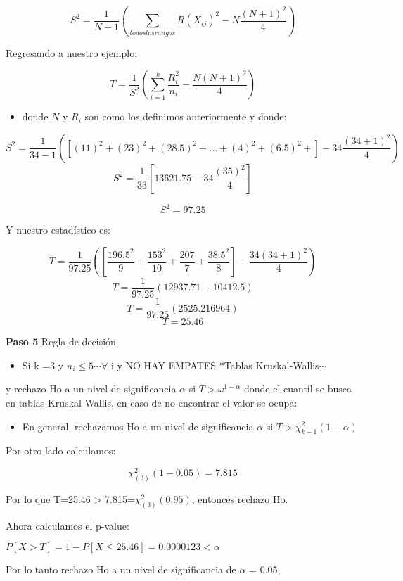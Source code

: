 \documentclass[a4paper,oneside,openany]{book}
\providecommand{\tightlist}{%
  \setlength{\itemsep}{0pt}\setlength{\parskip}{0pt}}
\begin{document}
\[ S^2 = \frac{1}{N-1}\left(\sum_{todos los rangos}R(X_{ij})^2-N\frac{(N+1)^2}{4}\right)\]

Regresando a nuestro ejemplo:

\[T= \frac{1}{S^2}\left(\sum_{i=1}^{k}\frac{R^2_{i}}{n_{i}}-\frac{N(N+1)^2}{4}\right)\]

\begin{itemize}
\tightlist
\item
  donde \(N\) y \(R_{i}\) son como los definimos anteriormente y donde:
\end{itemize}

\[ S^2 = \frac{1}{34-1}\left(\left[(11)^2+(23)^2+(28.5)^2+\ldots+(4)^2+(6.5)^2+\right]-34\frac{(34+1)^2}{4}\right)\]
\[S^2 = \frac{1}{33}\left[13621.75-34\frac{(35)^2}{4}\right]\]

\[S^2 = 97.25\]

Y nuestro estadístico es:

\[T= \frac{1}{97.25}\left(\left[\frac{196.5^2}{9}+\frac{153^2}{10}+\frac{207}{7}+\frac{38.5^2}{8}\right]-\frac{34(34+1)^2}{4}\right)\]
\[T= \frac{1}{97.25}\left(12937.71-10412.5\right)\]
\[T= \frac{1}{97.25}\left(2525.216964\right)\] \[T= 25.46\]

\textbf{Paso 5} Regla de decisión

\begin{itemize}
\tightlist
\item
  Si k =3 y \(n_{i}\leq 5 \cdots \forall\) i y NO HAY EMPATES *Tablas
  Kruskal-Wallis\(\cdots\)
\end{itemize}

y rechazo Ho a un nivel de significancia \(\alpha\) si
\(T > \omega^{1-\alpha}\) donde el cuantil se busca en tablas
Kruskal-Wallis, en caso de no encontrar el valor se ocupa:

\begin{itemize}
\tightlist
\item
  En general, rechazamos Ho a un nivel de significancia \(\alpha\) si
  \(T > \chi_{k-1}^2(1- \alpha)\)
\end{itemize}

Por otro lado calculamos:

\[\chi_{(3)}^2(1-0.05)=7.815\]

Por lo que T=25.46 \textgreater{} 7.815=\(\chi_{(3)}^2(0.95)\), entonces
rechazo Ho.

Ahora calculamos el p-value:

\(P[X>T]= 1-P[X\leq 25.46]=0.0000123 < \alpha\)

Por lo tanto rechazo Ho a un nivel de significancia de \(\alpha\) =
0.05,
\end{document}
